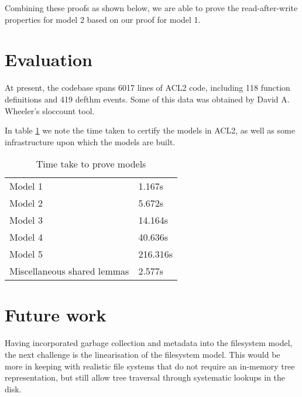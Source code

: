 \documentclass[format=sigconf,review=true]{acmart}
\begin{document}
Combining these proofs as shown below, we are able to prove the read-after-write
properties for model 2 based on our proof for model 1.


\section{Evaluation}
At present, the codebase spans 6017 lines of ACL2 code, including 118
function definitions and 419 defthm events. Some of this data was
obtained by David A. Wheeler's sloccount tool.

In table \ref{certification-timing-table} we note the time taken to certify
the models in ACL2, as well as some infrastructure upon which the
models are built.

\begin{table}[]
  \centering
  \caption{Time take to prove models}
  \label{certification-timing-table}
  \begin{tabular}{ll}
    Model 1 & 1.167s \\
    Model 2 & 5.672s \\
    Model 3 & 14.164s \\
    Model 4 & 40.636s \\
    Model 5 & 216.316s \\
    Miscellaneous shared lemmas & 2.577s \\
  \end{tabular}
\end{table}

\section{Future work}
Having incorporated garbage collection and metadata into the
filesystem model, the next challenge is the linearisation of the
filesystem model. This would be more in keeping
with realistic file systems that do not require an in-memory tree
representation, but still allow tree traversal through systematic
lookups in the disk.
\end{document}
